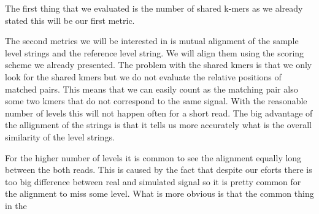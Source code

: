 The first thing that we evaluated is the number of shared k-mers as we already
stated this will be our first metric.

The second metrics we will be interested in is mutual alignment of the sample
level strings and the reference level string. We will align them using the scoring
scheme we already presented. The problem with the shared kmers is that we only look
for the shared kmers but we do not evaluate the relative positions of matched pairs.
This means that we can easily count as the matching pair also some two kmers that
do not correspond to the same signal. With the reasonable number of levels this will
not happen often for a short read. The big advantage of the allignment of the strings
is that it tells us more accurately what is the overall similarity of the level strings.

For the higher number of levels it is common to see the alignment equally
long between the both reads. This is caused by the fact that despite our eforts there
is too big difference between real and simulated signal so it is pretty common for
the alignment to miss some level. What is more obvious is that the common thing in
the
